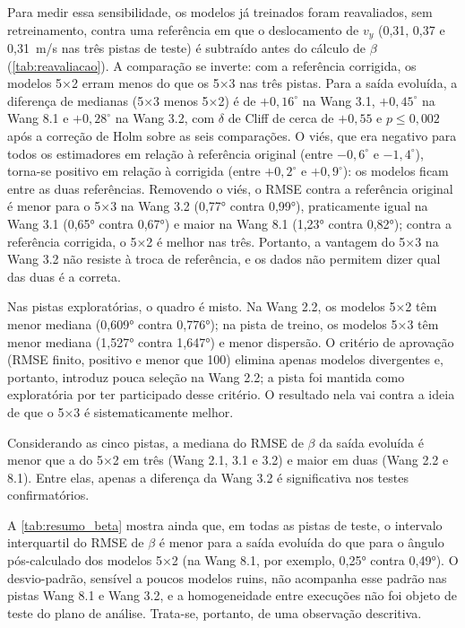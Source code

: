 Para medir essa sensibilidade, os modelos já treinados foram reavaliados, sem retreinamento, contra uma referência em que o deslocamento de $v_y$ (0,31, 0,37 e 0,31~m/s nas três pistas de teste) é subtraído antes do cálculo de $\beta$ (\autoref{tab:reavaliacao}). A comparação se inverte: com a referência corrigida, os modelos 5×2 erram menos do que os 5×3 nas três pistas. Para a saída evoluída, a diferença de medianas (5×3 menos 5×2) é de $+0{,}16^\circ$ na Wang 3.1, $+0{,}45^\circ$ na Wang 8.1 e $+0{,}28^\circ$ na Wang 3.2, com $\delta$ de Cliff de cerca de $+0{,}55$ e $p \le 0{,}002$ após a correção de Holm sobre as seis comparações. O viés, que era negativo para todos os estimadores em relação à referência original (entre $-0{,}6^\circ$ e $-1{,}4^\circ$), torna-se positivo em relação à corrigida (entre $+0{,}2^\circ$ e $+0{,}9^\circ$): os modelos ficam entre as duas referências. Removendo o viés, o RMSE contra a referência original é menor para o 5×3 na Wang 3.2 (0,77° contra 0,99°), praticamente igual na Wang 3.1 (0,65° contra 0,67°) e maior na Wang 8.1 (1,23° contra 0,82°); contra a referência corrigida, o 5×2 é melhor nas três. Portanto, a vantagem do 5×3 na Wang 3.2 não resiste à troca de referência, e os dados não permitem dizer qual das duas é a correta.



Nas pistas exploratórias, o quadro é misto. Na Wang 2.2, os modelos 5×2 têm menor mediana (0,609° contra 0,776°); na pista de treino, os modelos 5×3 têm menor mediana (1,527° contra 1,647°) e menor dispersão. O critério de aprovação (RMSE finito, positivo e menor que 100) elimina apenas modelos divergentes e, portanto, introduz pouca seleção na Wang 2.2; a pista foi mantida como exploratória por ter participado desse critério. O resultado nela vai contra a ideia de que o 5×3 é sistematicamente melhor.

Considerando as cinco pistas, a mediana do RMSE de $\beta$ da saída evoluída é menor que a do 5×2 em três (Wang 2.1, 3.1 e 3.2) e maior em duas (Wang 2.2 e 8.1). Entre elas, apenas a diferença da Wang 3.2 é significativa nos testes confirmatórios.

A \autoref{tab:resumo_beta} mostra ainda que, em todas as pistas de teste, o intervalo interquartil do RMSE de $\beta$ é menor para a saída evoluída do que para o ângulo pós-calculado dos modelos 5×2 (na Wang 8.1, por exemplo, 0,25° contra 0,49°). O desvio-padrão, sensível a poucos modelos ruins, não acompanha esse padrão nas pistas Wang 8.1 e Wang 3.2, e a homogeneidade entre execuções não foi objeto de teste do plano de análise. Trata-se, portanto, de uma observação descritiva.

